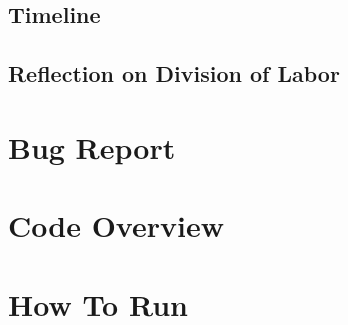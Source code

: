 \documentclass[12pt, letterpaper]{article}
\begin{document}
\subsection{Timeline}

\subsection{Reflection on Division of Labor}


\section{Bug Report}


\section{Code Overview}


\section{How To Run}
\end{document}
